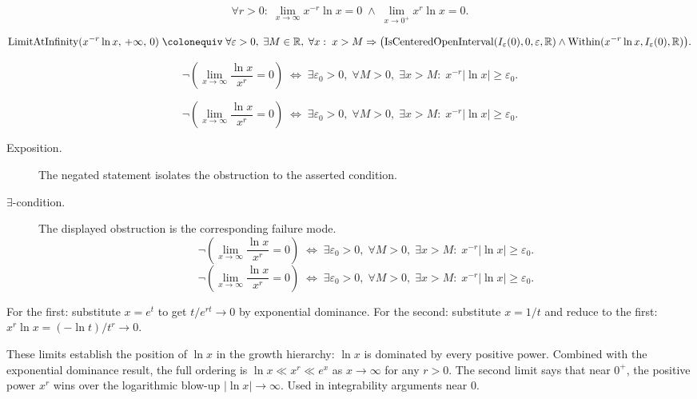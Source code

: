 \begin{remark*}
\[
  \forall r > 0 :\;
  \lim_{x \to \infty} x^{-r} \ln x = 0
  \;\wedge\;
  \lim_{x \to 0^+} x^r \ln x = 0.
\]
\end{remark*}

\begin{remark*}
\[
  \operatorname{LimitAtInfinity}(x^{-r}\ln x,\,+\infty,\,0)
  \;\colonequiv\;
  \forall\varepsilon>0,\;\exists M\in\mathbb{R},\;\forall x:\;
  x>M \Rightarrow
  \bigl(
    \operatorname{IsCenteredOpenInterval}(I_\varepsilon(0),0,\varepsilon,\mathbb R)
    \wedge
    \operatorname{Within}(x^{-r}\ln x,I_\varepsilon(0),\mathbb R)
  \bigr).
\]
\end{remark*}

\begin{remark*}
\[
  \neg\left(\lim_{x\to\infty}\frac{\ln x}{x^r}=0\right)
  \;\iff\;
  \exists\varepsilon_0>0,\;\forall M>0,\;\exists x>M:\;
  x^{-r}|\ln x|\geq\varepsilon_0.
\]
\end{remark*}

\begin{remark*}
\[
\neg\left(\lim_{x\to\infty}\frac{\ln x}{x^r}=0\right)
  \;\iff\;
  \exists\varepsilon_0>0,\;\forall M>0,\;\exists x>M:\;
  x^{-r}|\ln x|\geq\varepsilon_0.
\]
\end{remark*}

\begin{remark*}
\begin{description}
  \item[Exposition.]
  The negated statement isolates the obstruction to the asserted condition.

  \item[\(\exists\)-condition.]
  The displayed obstruction is the corresponding failure mode.
  \[
\neg\left(\lim_{x\to\infty}\frac{\ln x}{x^r}=0\right)
  \;\iff\;
  \exists\varepsilon_0>0,\;\forall M>0,\;\exists x>M:\;
  x^{-r}|\ln x|\geq\varepsilon_0.
  \]
  \[
\neg\left(\lim_{x\to\infty}\frac{\ln x}{x^r}=0\right)
  \;\iff\;
  \exists\varepsilon_0>0,\;\forall M>0,\;\exists x>M:\;
  x^{-r}|\ln x|\geq\varepsilon_0.
  \]
\end{description}
\end{remark*}



\begin{remark*}[Interpretation]
For the first: substitute $x = e^t$ to get $t/e^{rt} \to 0$ by
exponential dominance. For the second: substitute $x = 1/t$ and
reduce to the first: $x^r \ln x = (-\ln t)/t^r \to 0$.


These limits establish the position of $\ln x$ in the growth
hierarchy: $\ln x$ is dominated by every positive power. Combined
with the exponential dominance result, the full ordering is
$\ln x \ll x^r \ll e^x$ as $x \to \infty$ for any $r > 0$.
The second limit says that near $0^+$, the positive power $x^r$
wins over the logarithmic blow-up $|\ln x| \to \infty$. Used in
integrability arguments near $0$.
\end{remark*}

